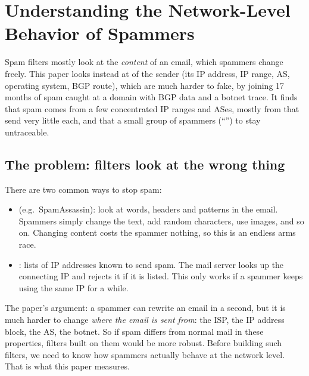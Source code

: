 \chapter{Understanding the Network-Level Behavior of Spammers}

\begin{keybox}
Spam filters mostly look at the \emph{content} of an email, which spammers change freely. This paper looks instead at
 of the sender (its IP address, IP range, AS, operating system, BGP route), which are much harder to
fake, by joining 17 months of spam caught at a  domain with BGP data and a botnet trace. It finds that spam comes from a
few concentrated IP ranges and ASes, mostly from  that send very little each, and that a small group of
spammers  (``'') to stay untraceable.
\end{keybox}

\section{The problem: filters look at the wrong thing}

There are two common ways to stop spam:
\begin{itemize}
  \item {} (e.g.\ SpamAssassin): look at words, headers and patterns in the email. Spammers simply change the text,
        add random characters, use images, and so on. Changing content costs the spammer nothing, so this is an endless arms race.
  \item {}: lists of IP addresses known to send spam. The mail server looks up the connecting IP and rejects it if
        it is listed. This only works if a spammer keeps using the same IP for a while.
\end{itemize}

The paper's argument: a spammer can rewrite an email in a second, but it is much harder to change \emph{where the email is sent from}: the
ISP, the IP address block, the AS, the botnet. So if spam differs from normal mail in these  properties, filters built on
them would be more robust. Before building such filters, we need to know how spammers actually behave at the network level. That is what
this paper measures.

